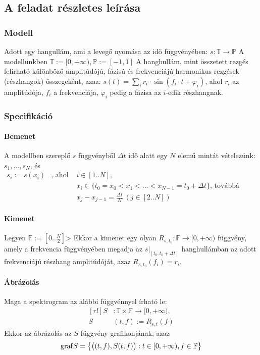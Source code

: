 
\subsection{A feladat r\'eszletes le\'ir\'asa}
\subsubsection{Modell}
Adott egy hangull\'am, ami a leveg\H o nyom\'asa az id\H o f\"uggv\'eny\'eben:
\(s: \mathbb{T} \rightarrow \mathbb{P} \) \newline
A modell\"unkben $\mathbb{T}:=[0,+\infty), \mathbb{P}:=[-1,1] $ \newline
A hanghull\'am, mint \"osszetett rezg\'es fel\'irhat\'o k\"ul\"onb\"oz\H o amplit\'ud\'oj\'u, f\'azis\'u \'es frekvenci\'aj\'u harmonikus rezg\'esek (r\'eszhangok) \"osszegek\'ent, azaz: \newline
\( s(t) = \sum_i r_i\cdot\sin{(f_i\cdot t + \varphi_i)} \), ahol $r_i$ az amplit\'ud\'oja, $f_i$ a frekvenci\'aja, $\varphi_i$ pedig a f\'azisa az $i$-edik r\'eszhangnak.
\subsubsection{Specifik\'aci\'o}
\paragraph{Bemenet}
A modellben szerepl\H o $s$ f\"uggv\'enyb\H ol $\Delta t$ id\H o alatt egy $N$ elem\H u mint\'at v\'etelez\"unk: $s_1,\dots,s_{N}$, \'es \newline
\( \begin{array}{rcl}
s_i := s(x_i) & \text{, ahol } & i\in[1..N],\\
&&x_i\in\{ t_0 = x_0 < x_1 < \dots < x_{N-1} = t_0 + \Delta t \} \text{, tov\'abb\'a } \\
&&x_j - x_{j-1} = \frac{\Delta t}{N}\ (j\in[2..N] ) 
\end{array} \)
\paragraph{Kimenet}
Legyen $\mathbb{F}:=\left[ 0..\frac{N}{2} \right]$\newline>
Ekkor a kimenet egy olyan $R_{s,t_0}:\mathbb{F} \rightarrow [0,+\infty)$ f\"uggv\'eny, amely a frekvencia f\"uggv\'eny\'eben megadja az $s\rvert_{[t_0,t_0+\Delta t]}$ hanghull\'amban az adott frekvenci\'aj\'u r\'eszhang amplit\'ud\'oj\'at, azaz $R_{s,t_0}(f_i) = r_i$.
\paragraph{\'Abr\'azol\'as}
Maga a spektrogram az al\'abbi f\"uggv\'ennyel \'irhat\'o le:
\[ \begin{aligned}[rl]
S&:\mathbb{T}\times\mathbb{F} \rightarrow [0,+\infty), \\
S&(t,f):=R_{s,t}(f)
\end{aligned}
\]
Ekkor az \'abr\'azol\'as az $S$ f\"uggv\'eny grafikonj\'anak, azaz
\[
\mathrm{graf} S = \left\{ \big( (t,f) ,S(t,f) \big) : t\in [0,+\infty), f\in\mathbb{F} \right\}
\]

